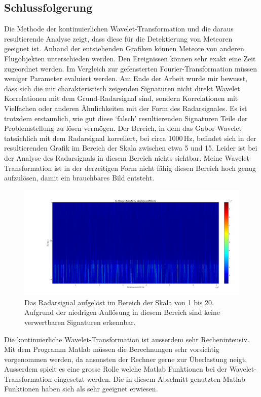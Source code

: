 \begin{refsection}
\section{Schlussfolgerung}

Die Methode der kontinuierlichen Wavelet-Transformation und die daraus resultierende Analyse zeigt, dass diese für die Detektierung von Meteoren geeignet ist.
Anhand der entstehenden Grafiken können Meteore von anderen Flugobjekten unterschieden werden.
Den Ereignissen können sehr exakt eine Zeit zugeordnet werden.
Im Vergleich zur gefensterten Fourier-Transformation müssen weniger Parameter evaluiert werden.
Am Ende der Arbeit wurde mir bewusst, dass sich die mir charakteristisch zeigenden Signaturen nicht direkt Wavelet Korrelationen mit dem Grund-Radarsignal sind, sondern Korrelationen mit Vielfachen oder anderen Ähnlichkeiten mit der Form des Radarsignales.
Es ist trotzdem erstaunlich, wie gut diese `falsch' resultierenden Signaturen Teile der Problemstellung zu lösen vermögen.
Der Bereich, in dem das Gabor-Wavelet tatsächlich mit dem Radarsignal korreliert, bei circa 1000\,Hz, befindet sich in der resultierenden Grafik im Bereich der Skala zwischen etwa 5 und 15.
Leider ist bei der Analyse des Radarsignals in diesem Bereich nichts sichtbar.
Meine Wavelet-Transformation ist in der derzeitigen Form nicht fähig diesen Bereich hoch genug aufzulösen, damit ein brauchbares Bild entsteht.
\begin{figure}
	\centering
	\includegraphics[width=\linewidth]{papers/meteor/images/anomalie/cwt_signal_scale1to20.png}
	\caption{Das Radarsignal aufgelöst im Bereich der Skala von 1 bis 20. 
	Aufgrund der niedrigen Auflösung in diesem Bereich sind keine verwertbaren Signaturen erkennbar.}
	\label{fig:signalmitwscaloscale1to20}
\end{figure}

Die kontinuierliche Wavelet-Transformation ist ausserdem sehr Rechenintensiv. 
Mit dem Programm Matlab müssen die Berechnungen sehr vorsichtig vorgenommen werden, da ansonsten der Rechner gerne zur Überlastung neigt.
Ausserdem spielt es eine grosse Rolle welche Matlab Funktionen bei der Wavelet-Transformation eingesetzt werden.
Die in diesem Abschnitt genutzten Matlab Funktionen haben sich als sehr geeignet erwiesen.  

\printbibliography[heading=subbibliography]
\end{refsection}
